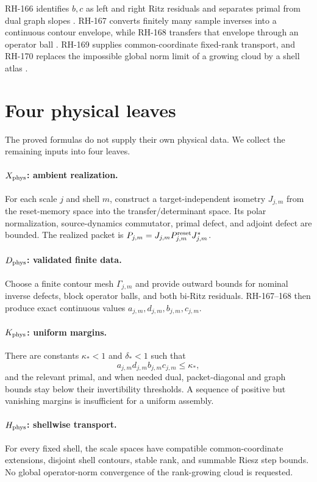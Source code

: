 \documentclass[12pt]{article}
\begin{document}
RH-166 identifies $b,c$ as left and right Ritz residuals and separates primal
from dual graph slopes \citep{WangRH166}.  RH-167 converts finitely many
sample inverses into a continuous contour envelope, while RH-168 transfers
that envelope through an operator ball \citep{WangRH167,WangRH168}.
RH-169 supplies common-coordinate fixed-rank transport, and RH-170 replaces
the impossible global norm limit of a growing cloud by a shell atlas
\citep{WangRH169,WangRH170}.

\section{Four physical leaves}
The proved formulas do not supply their own physical data.  We collect the
remaining inputs into four leaves.

\paragraph{$X_{\rm phys}$: ambient realization.}
For each scale $j$ and shell $m$, construct a target-independent isometry
$J_{j,m}$ from the reset-memory space into the transfer/determinant space.
Its polar normalization, source-dynamics commutator, primal defect, and
adjoint defect are bounded.  The realized packet is
$P_{j,m}=J_{j,m}P^{\rm reset}_{j,m}J_{j,m}^*$.

\paragraph{$D_{\rm phys}$: validated finite data.}
Choose a finite contour mesh $\Gamma_{j,m}$ and provide outward bounds for
nominal inverse defects, block operator balls, and both bi-Ritz residuals.
RH-167--168 then produce exact continuous values
$a_{j,m},d_{j,m},b_{j,m},c_{j,m}$.

\paragraph{$K_{\rm phys}$: uniform margins.}
There are constants $\kappa_*<1$ and $\delta_*<1$ such that
\[
 a_{j,m}d_{j,m}b_{j,m}c_{j,m}\le\kappa_*,
\]
and the relevant primal, and when needed dual, packet-diagonal and graph
bounds stay below their invertibility thresholds.  A sequence of positive
but vanishing margins is insufficient for a uniform assembly.

\paragraph{$H_{\rm phys}$: shellwise transport.}
For every fixed shell, the scale spaces have compatible common-coordinate
extensions, disjoint shell contours, stable rank, and summable Riesz step
bounds.  No global operator-norm convergence of the rank-growing cloud is
requested.
\end{document}
